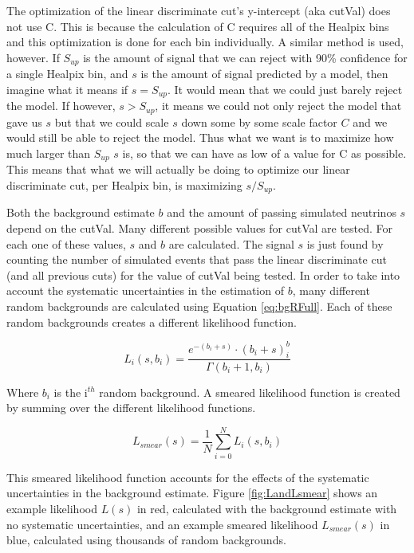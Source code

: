 The optimization of the linear discriminate cut's y-intercept (aka cutVal) does not use C.  This is because the calculation of C requires all of the Healpix bins and this optimization is done for each bin individually.  A similar method is used, however.  If $S_{up}$ is the amount of signal that we can reject with 90\% confidence for a single Healpix bin, and $s$ is the amount of signal predicted by a model, then imagine what it means if $s = S_{up}$.  It would mean that we could just barely reject the model.  If however, $s > S_{up}$, it means we could not only reject the model that gave us $s$ but that we could scale $s$ down some by some scale factor $C$ and we would still be able to reject the model.  Thus what we want is to maximize how much larger than $S_{up}$ $s$ is, so that we can have as low of a value for C as possible.  This means that what we will actually be doing to optimize our linear discriminate cut, per Healpix bin, is maximizing $s/S_{up}$.

Both the background estimate $b$ and the amount of passing simulated neutrinos $s$ depend on the cutVal.  Many different possible values for cutVal are tested.  For each one of these values, $s$ and $b$ are calculated.  The signal $s$ is just found by counting the number of simulated events that pass the linear discriminate cut (and all previous cuts) for the value of cutVal being tested.  In order to take into account the systematic uncertainties in the estimation of $b$, many different random backgrounds are calculated using Equation \ref{eq:bgRFull}.  Each of these random backgrounds creates a different likelihood function.

\begin{equation} \label{eq:L_i}
L_i(s,b_i) = \frac{e^{-(b_i+s)} \cdot (b_i+s)^b_i}{\Gamma(b_i+1,b_i)}
\end{equation}

Where $b_i$ is the i$^{th}$ random background.  A smeared likelihood function is created by summing over the different likelihood functions.

\begin{equation} \label{eq:L_smear}
L_{smear}(s) = \frac{1}{N} \sum_{i=0}^N L_i(s,b_i)
\end{equation}

This smeared likelihood function accounts for the effects of the systematic uncertainties in the background estimate.  Figure \ref{fig:LandLsmear} shows an example likelihood $L(s)$ in red, calculated with the background estimate with no systematic uncertainties, and an example smeared likelihood $L_{smear}(s)$ in blue, calculated using thousands of random backgrounds.  
 
